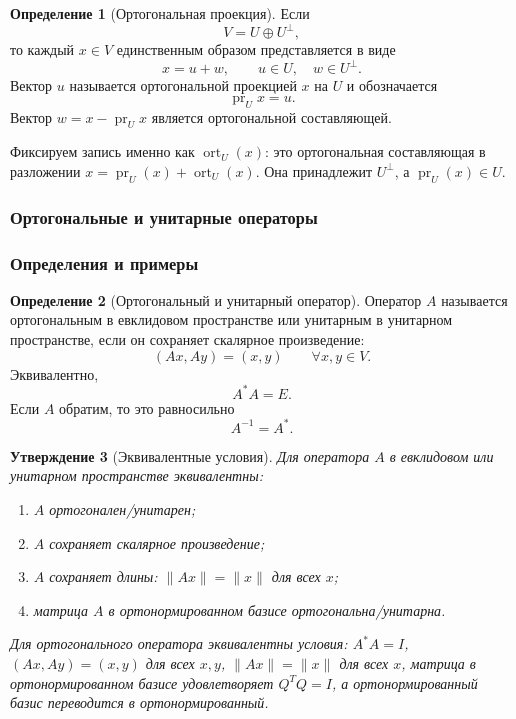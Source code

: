 \documentclass[12pt,a4paper]{article}
\theoremstyle{definition}
\newtheorem{definition}{Определение}[section]
\theoremstyle{plain}
\newtheorem{proposition}[definition]{Утверждение}
\theoremstyle{remark}
\newenvironment{knowledgefix}{\begin{clarifybox}}{\end{clarifybox}}
\newcommand{\pr}{\operatorname{pr}}
\newcommand{\ort}{\operatorname{ort}}
\begin{document}
\begin{definition}[Ортогональная проекция]
Если
\[
    V=U\oplus U^\perp,
\]
то каждый $x\in V$ единственным образом представляется в виде
\[
    x=u+w,
    \qquad u\in U,
    \quad w\in U^\perp.
\]
Вектор $u$ называется ортогональной проекцией $x$ на $U$ и обозначается
\[
    \pr_U x=u.
\]
Вектор $w=x-\pr_Ux$ является ортогональной составляющей.
\begin{knowledgefix}
Фиксируем запись именно как \(\ort_U(x)\): это ортогональная составляющая в разложении \(x=\pr_U(x)+\ort_U(x)\). Она принадлежит \(U^\perp\), а \(\pr_U(x)\in U\).
\end{knowledgefix}
\end{definition}

\subsubsection{Ортогональные и унитарные операторы}

\subsubsection*{Определения и примеры}

\begin{definition}[Ортогональный и унитарный оператор]
Оператор $A$ называется ортогональным в евклидовом пространстве или унитарным в унитарном пространстве, если он сохраняет скалярное произведение:
\[
    (Ax,Ay)=(x,y)
    \qquad \forall x,y\in V.
\]
Эквивалентно,
\[
    A^*A=E.
\]
Если $A$ обратим, то это равносильно
\[
    A^{-1}=A^*.
\]
\end{definition}

\begin{proposition}[Эквивалентные условия]
Для оператора $A$ в евклидовом или унитарном пространстве эквивалентны:
\begin{enumerate}[label=\arabic*)]
    \item $A$ ортогонален/унитарен;
    \item $A$ сохраняет скалярное произведение;
    \item $A$ сохраняет длины: $\|Ax\|=\|x\|$ для всех $x$;
    \item матрица $A$ в ортонормированном базисе ортогональна/унитарна.
\end{enumerate}
\begin{knowledgefix}
Для ортогонального оператора эквивалентны условия: \(A^*A=I\), \((Ax,Ay)=(x,y)\) для всех \(x,y\), \(\|Ax\|=\|x\|\) для всех \(x\), матрица в ортонормированном базисе удовлетворяет \(Q^TQ=I\), а ортонормированный базис переводится в ортонормированный.
\end{knowledgefix}
\end{proposition}
\end{document}
